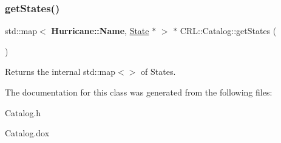 \subsubsection{\texorpdfstring{get\+States()}{getStates()}}
{\footnotesize\ttfamily std\+::map$<$ \textbf{ Hurricane\+::\+Name}, \hyperlink{classCRL_1_1Catalog_1_1State}{State} $\ast$ $>$ $\ast$ C\+R\+L\+::\+Catalog\+::get\+States (\begin{DoxyParamCaption}{ }\end{DoxyParamCaption})\hspace{0.3cm}{\ttfamily [inline]}}

\begin{DoxyReturn}{Returns}
the internal std\+::map$<$$>$ of States. 
\end{DoxyReturn}


The documentation for this class was generated from the following files\+:\begin{DoxyCompactItemize}
\item 
Catalog.\+h\item 
Catalog.\+dox\end{DoxyCompactItemize}
